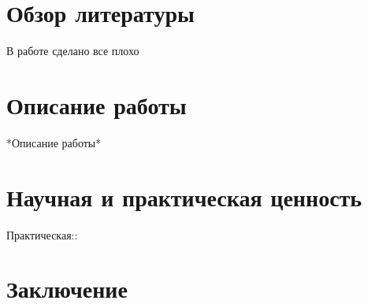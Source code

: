 \documentclass{article}
\begin{document}
\section{Обзор литературы}
В работе \cite{greenwade93} сделано все плохо
\section{Описание работы}
*Описание работы*
\section{Научная и практическая ценность}
Практическая::
\section{Заключение}
\end{document}
